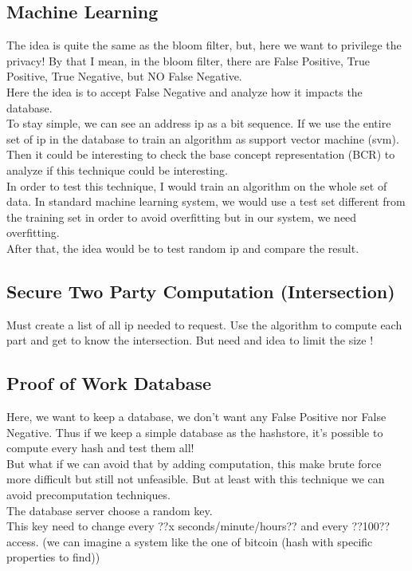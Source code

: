 \documentclass{eplmastersthesis}
\begin{document}
\subsection{Machine Learning}
The idea is quite the same as the bloom filter, but, here we want to privilege the privacy! By that I mean, in the bloom filter, there are False Positive, True Positive, True Negative, but NO False Negative.\\
Here the idea is to accept False Negative and analyze how it impacts the database.\\
To stay simple, we can see an address ip as a bit sequence. If we use the entire set of ip in the database to train an algorithm as support vector machine (svm).\\
Then it could be interesting to check the base concept representation (BCR) to analyze if this technique could be interesting. \\

In order to test this technique, I would train an algorithm on the whole set of data. In standard machine learning system, we would use a test set different from the training set in order to avoid overfitting but in our system, we need overfitting. \\
After that, the idea would be to test random  ip and compare the result.

\subsection{Secure Two Party Computation (Intersection)}
Must create a list of all ip needed to request.
Use the algorithm to compute each part and get to know the intersection.
But need and idea to limit the size ! 

\subsection{Proof of Work Database}
Here, we want to keep a database, we don't want any False Positive nor False Negative. Thus if we keep a simple database as the hashstore, it's possible to compute every hash and test them all!\\
But what if we can avoid that by adding computation, this make brute force more difficult but still not unfeasible. But at least with this technique we can avoid precomputation techniques.\\

The database server choose a random key.\\
This key need to change every ??x seconds/minute/hours?? and every ??100?? access.
(we can imagine a system like the one of bitcoin (hash with specific properties to find))
\end{document}
